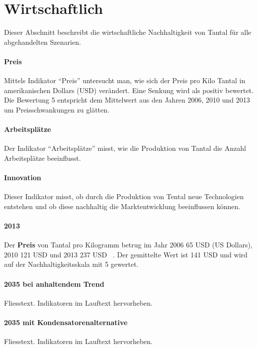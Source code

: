 
\section{Wirtschaftlich}\label{sec:conflict}

Dieser Abschnitt beschreibt die wirtschaftliche Nachhaltigkeit von Tantal für alle abgehandelten Szenarien.
\paragraph{Preis}
Mittels Indikator ``Preis'' untersucht man, wie sich der Preis pro Kilo Tantal
in amerikanischen Dollars (USD) verändert. Eine Senkung wird als positiv bewertet. Die Bewertung 5 entspricht dem Mittelwert aus den Jahren 2006, 2010 und 2013 um Preisschwankungen zu glätten.

\paragraph{Arbeitsplätze}
Der Indikator ``Arbeitsplätze'' misst, wie die Produktion von Tantal die Anzahl
Arbeitsplätze beeinflusst.

\paragraph{Innovation}
Dieser Indikator misst, ob durch die Produktion von Tental neue Technologien
entstehen und ob diese nachhaltig die Marktentwicklung beeinflussen können.

\paragraph{2013}
Der \textbf{Preis} von Tantal pro Kilogramm betrug im Jahr 2006 65 USD (US Dollars), 2010 121 USD und 2013 237 USD ~\cite{tantal_price2}. Der gemittelte Wert ist 141 USD und wird auf der Nachhaltigkeitsskala mit 5 gewertet. \\


\paragraph{2035 bei anhaltendem Trend}
Fliesstext. Indikatoren im Lauftext hervorheben.

\paragraph{2035 mit Kondensatorenalternative}
Fliesstext. Indikatoren im Lauftext hervorheben.

